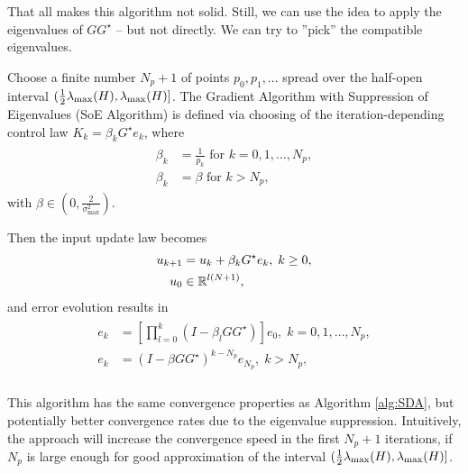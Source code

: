 That all makes this algorithm not solid. Still, we can use the idea to apply the eigenvalues of $G G^{\star}$ -- but not directly. We can try to ''pick'' the compatible eigenvalues.
\begin{alg}
	Choose a finite number $N_p + 1$ of points $p_0, p_1, \dots$ spread over the half-open interval $(\frac{1}{2}\lambda_{\mathrm{max}}(H), \lambda_{\mathrm{max}}(H)]$. 
	The Gradient Algorithm with Suppression of Eigenvalues (SoE Algorithm) is defined via choosing of the iteration-depending control law  $K_k = \beta_k G^\star e_k$, where 
	\begin{align}
	\begin{split}
	\beta_k &= \frac{1}{p_k} \text{ for } k = 0 , 1, \dots , N_p,\\
	\beta_k &= \beta  \text{ for } k > N_p,
	\end{split}
	\end{align}
	with $\beta \in (0, \frac{2}{\sigma_{\max}^2})$.
	
	Then the input update law becomes 
	\begin{align}
		u_{k+1} &= u_k + \beta_k G^\star e_k, \; k\geq 0,\\
		u_0 &\in {\mathbb{R}}^{l(N+1)}, 
	\end{align}
	and error evolution results in 
	\begin{align}
	\begin{split}
	e _{k} &= \left[\prod_{l = 0}^k (I - \beta_l  GG^\star) \right] e_{0}, \;  k = 0 , 1, \dots , N_p,\\
	e _{k} &=  (I - \beta GG^\star)^{k - N_p} e_{N_p}, \;  k > N_p, \\
	\end{split}
	\end{align}	
\end{alg}

This algorithm has the same convergence properties as Algorithm \ref{alg:SDA}, but potentially better convergence rates due to the eigenvalue suppression. Intuitively, the approach will increase the convergence speed in the first $N_p + 1$ iterations, if $N_p$ is large enough for good approximation of the interval $(\frac{1}{2} \lambda_{\mathrm{max}}(H), \lambda_{\mathrm{max}}(H)]$.

